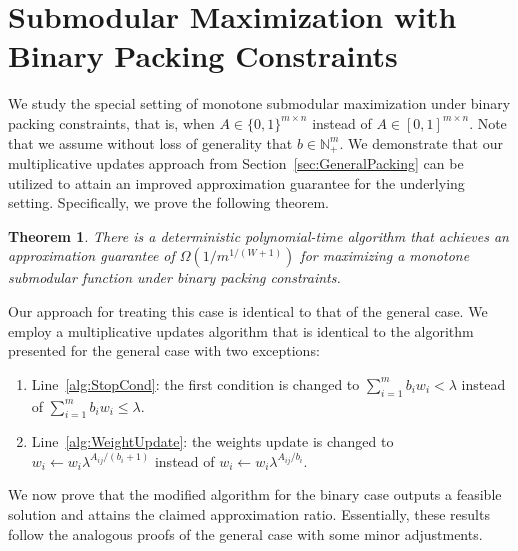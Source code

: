 \documentclass[11pt]{article}
\theoremstyle{plain}
\newtheorem{theorem}{Theorem}[section]
\theoremstyle{definition}
\newcommand{\bbN}{\mathbb{N}}
\begin{document}
\appendix
\section{Submodular Maximization with Binary Packing Constraints} \label{appsec:0-1}
We study the special setting of monotone submodular maximization
under binary packing constraints, that is, when $A \in \{0,1\}^{m
\times n}$ instead of $A \in [0,1]^{m \times n}$. Note that we
assume without loss of generality that $b \in \bbN_+^m$. We
demonstrate that our multiplicative updates approach from
Section~\ref{sec:GeneralPacking} can be utilized to attain an
improved approximation guarantee for the underlying setting.
Specifically, we prove the following theorem.

\begin{theorem} \label{th:MainResult3}
There is a deterministic polynomial-time algorithm that achieves
an approximation guarantee of $\Omega(1 / m^{1/(W+1)})$ for
maximizing a monotone submodular function under binary packing
constraints.
\end{theorem}

Our approach for treating this case is identical to that of the
general case. We employ a multiplicative updates algorithm that is
identical to the algorithm presented for the general case with two
exceptions:
\begin{enumerate}
\item Line~\ref{alg:StopCond}: the first condition is changed to
$\sum_{i=1}^m b_i w_i < \lambda$ instead of $\sum_{i=1}^m b_i w_i
\leq \lambda$.

\item Line~\ref{alg:WeightUpdate}: the weights update is changed
to $w_i \leftarrow w_i \lambda^{A_{ij}/(b_i + 1)}$ instead of $w_i
\leftarrow w_i \lambda^{A_{ij}/b_i}$.
\end{enumerate}

We now prove that the modified algorithm for the binary case
outputs a feasible solution and attains the claimed approximation
ratio. Essentially, these results follow the analogous proofs of
the general case with some minor adjustments.
\end{document}
